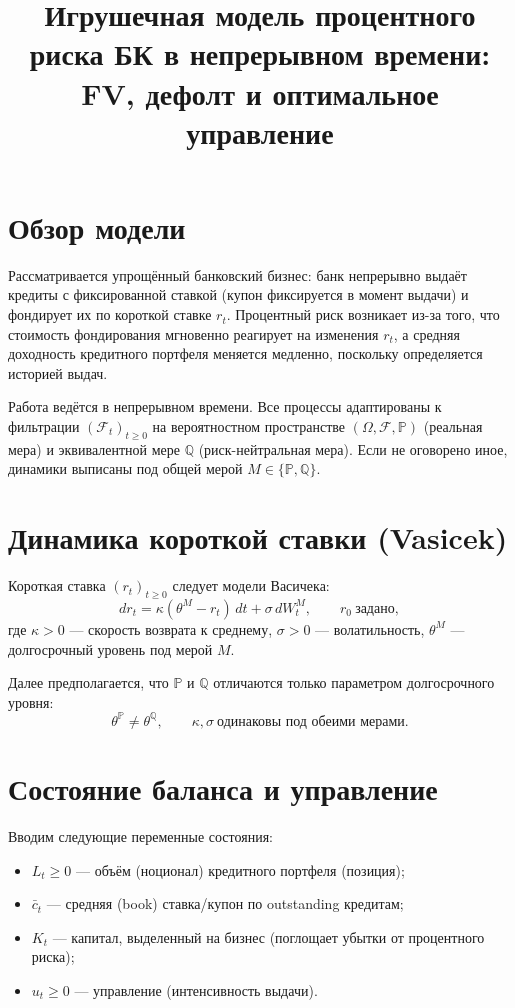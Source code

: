 \documentclass[11pt]{article}
\title{Игрушечная модель процентного риска БК в непрерывном времени: FV, дефолт и оптимальное управление}
\author{}
\date{}
\newcommand{\Q}{\mathbb{Q}}
\newcommand{\Pp}{\mathbb{P}}
\newcommand{\1}{\mathbf{1}}
\begin{document}
\maketitle

\section{Обзор модели}
Рассматривается упрощённый банковский бизнес: банк непрерывно выдаёт кредиты с фиксированной ставкой (купон фиксируется в момент выдачи) и фондирует их по короткой ставке $r_t$. Процентный риск возникает из-за того, что стоимость фондирования мгновенно реагирует на изменения $r_t$, а средняя доходность кредитного портфеля меняется медленно, поскольку определяется историей выдач.

Работа ведётся в непрерывном времени. Все процессы адаптированы к фильтрации $(\mathcal{F}_t)_{t\ge 0}$ на вероятностном пространстве $(\Omega,\mathcal{F},\Pp)$ (реальная мера) и эквивалентной мере $\Q$ (риск-нейтральная мера). Если не оговорено иное, динамики выписаны под общей мерой $M\in\{\Pp,\Q\}$.

\section{Динамика короткой ставки (Vasicek)}
Короткая ставка $(r_t)_{t\ge 0}$ следует модели Васичека:
\begin{equation}
dr_t = \kappa(\theta^{M}-r_t)\,dt + \sigma\,dW_t^{M},
\qquad r_0 \ \text{задано},
\label{eq:vasicek}
\end{equation}
где $\kappa>0$ --- скорость возврата к среднему, $\sigma>0$ --- волатильность, $\theta^{M}$ --- долгосрочный уровень под мерой $M$.

Далее предполагается, что $\Pp$ и $\Q$ отличаются только параметром долгосрочного уровня:
\[
\theta^{\Pp} \neq \theta^{\Q}, \qquad \kappa,\sigma \ \text{одинаковы под обеими мерами.}
\]

\section{Состояние баланса и управление}
Вводим следующие переменные состояния:
\begin{itemize}
  \item $L_t \ge 0$ --- объём (ноционал) кредитного портфеля (позиция);
  \item $\bar c_t$ --- средняя (book) ставка/купон по outstanding кредитам;
  \item $K_t$ --- капитал, выделенный на бизнес (поглощает убытки от процентного риска);
  \item $u_t \ge 0$ --- управление (интенсивность выдачи).
\end{itemize}
\end{document}

